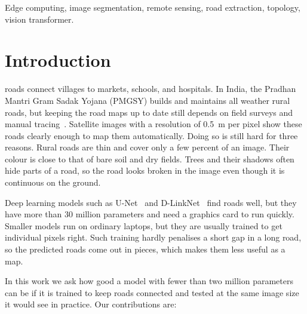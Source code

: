 \documentclass{ieeeaccess}
\begin{document}
\begin{keywords}
Edge computing, image segmentation, remote sensing, road extraction, topology, vision transformer.
\end{keywords}

\titlepgskip=-15pt

\maketitle

\section{Introduction}
\label{sec:introduction}

 roads connect villages to markets, schools, and hospitals. In India, the Pradhan Mantri Gram Sadak Yojana (PMGSY) builds and maintains all weather rural roads, but keeping the road maps up to date still depends on field surveys and manual tracing~\cite{pmgsy}. Satellite images with a resolution of 0.5~m per pixel show these roads clearly enough to map them automatically. Doing so is still hard for three reasons. Rural roads are thin and cover only a few percent of an image. Their colour is close to that of bare soil and dry fields. Trees and their shadows often hide parts of a road, so the road looks broken in the image even though it is continuous on the ground.

Deep learning models such as U-Net~\cite{ronneberger2015unet} and D-LinkNet~\cite{zhou2018dlinknet} find roads well, but they have more than 30 million parameters and need a graphics card to run quickly. Smaller models run on ordinary laptops, but they are usually trained to get individual pixels right. Such training hardly penalises a short gap in a long road, so the predicted roads come out in pieces, which makes them less useful as a map.

In this work we ask how good a model with fewer than two million parameters can be if it is trained to keep roads connected and tested at the same image size it would see in practice. Our contributions are:
\end{document}
